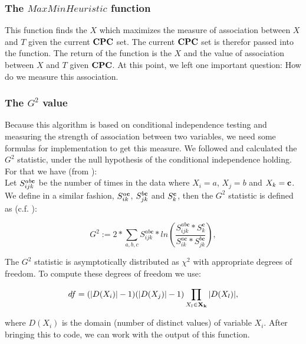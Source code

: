 			\subsubsection{The $MaxMinHeuristic$ function}

				This function finds the $X$ which maximizes the measure of association between $X$ and $T$ given the current ${\textbf{CPC}}$ set. The current ${\textbf{CPC}}$ set is therefor passed into the function. The return of the function is the $X$ and the value of association between $X$ and $T$ given ${\textbf{CPC}}$. At this point, we left one important question: How do we measure this association.

			\subsubsection{The $G^{2}$ value}

				Because this algorithm is based on conditional independence testing and measuring the strength of association between two variables, we need some formulas for implementation to get this measure. We followed \cite{SGSN} and calculated the $G^{2}$ statistic, under the null hypothesis of the conditional independence holding. For that we have (from \cite{TBA}):\\
				Let $S_{ijk}^{ab{\textbf{c}}}$ be the number of times in the data where $X_{i} = a$, $X_{j} = b$ and $X_{k} = {\textbf{c}}$. We define in a similar fashion, $S_{ik}^{a{\textbf{c}}}$, $S_{jk}^{b{\textbf{c}}}$  and $S_{k}^{{\textbf{c}}}$, then the $G^{2}$ statistic is defined as (c.f. \cite{SGSN}):

				\begin{equation}
					G^{2} := 2 * \sum_{a,b,c} S^{ab\textbf{c}}_{ijk} * ln \left( \frac{S^{ab\textbf{c}}_{ijk}*S^{\textbf{c}}_{k}}{S^{a\textbf{c}}_{ik}*S^{b\textbf{c}}_{jk}} \right),
				\end{equation}

				The $G^{2}$ statistic is asymptotically distributed as $\chi^{2}$ with appropriate degrees of freedom. To compute these degrees of freedom we use:

				\begin{equation}
					df = (|D(X_{i})| - 1)(|D(X_{j})| - 1) \prod_{X_{l} \in {\textbf{X}}_{{\textbf{k}}}} |D(X_{l})|,
				\end{equation}

				where $D(X_{i})$ is the domain (number of distinct values) of variable $X_{i}$. After bringing this to code, we can work with the output of this function.

